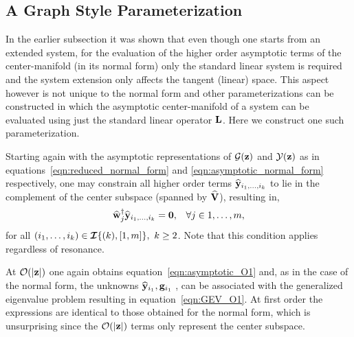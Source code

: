 \subsection{A Graph Style Parameterization}
\label{sec:graph_method}

In the earlier subsection it was shown that even though one starts from an extended system, for the evaluation of the higher order asymptotic terms of the center-manifold (in its normal form) only  the standard linear system is required and the system extension only affects the tangent (linear) space. This aspect however is not unique to the normal form and other parameterizations can be constructed in which the asymptotic center-manifold of a system can be evaluated using just the standard linear operator $\mathbf{L}$. Here we construct one such parameterization.

Starting again with the asymptotic representations of $\mathcal{G}(\mathbf{z})$ and $\mathcal{Y}(\mathbf{z})$ as in equations~\eqref{eqn:reduced_normal_form} and \eqref{eqn:asymptotic_normal_form} respectively, one may constrain all higher order terms $\widehat{\mathbf{y}}_{i_{1},\ldots,i_{k}}$ to lie in the complement of the center subspace (spanned by $\widehat{\mathbf{V}}$), resulting in,
\begin{align}
	\label{eqn:graph_condition}
	\widehat{\mathbf{w}}^{\dagger}_{j}\widehat{\mathbf{y}}_{i_{1},\ldots,i_{k}} = \mathbf{0}, && \forall j\in1,\ldots,m,
\end{align}
for all $(i_{1},\ldots,i_{k})\in\IndexSet{k}{1,m},\ k\ge2$. Note that this condition applies regardless of resonance. 

At $\mathcal{O}(|\mathbf{z}|)$ one again obtains equation~\eqref{eqn:asymptotic_O1} and, as in the case of the normal form, the unknowns $\widehat{\mathbf{y}}_{i_{1}},\mathbf{g}_{i_{1}}$ \etc, can be associated with the generalized eigenvalue problem resulting in equation~\eqref{eqn:GEV_O1}. At first order the expressions are identical to those obtained for the normal form, which is unsurprising since the $\mathcal{O}(|\mathbf{z}|)$ terms only represent the center subspace.

